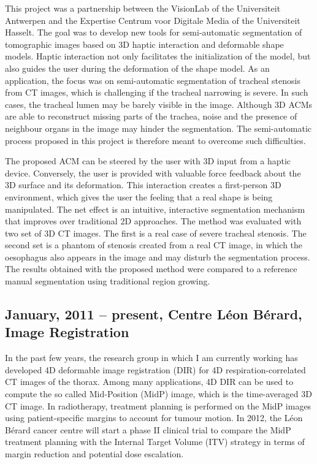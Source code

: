 \documentclass[a4paper]{article}
\begin{document}
This project was a partnership between the VisionLab of the Universiteit Antwerpen and the Expertise Centrum voor Digitale Media of the Universiteit Hasselt. The goal was to develop new tools for semi-automatic segmentation of tomographic images based on 3D haptic interaction and deformable shape models. Haptic interaction not only facilitates the initialization of the model, but also guides the user during the deformation of the shape model. As an application, the focus was on semi-automatic segmentation of tracheal stenosis from CT images, which is challenging if the tracheal narrowing is severe. In such cases, the tracheal lumen may be barely visible in the image. Although 3D ACMs are able to reconstruct missing parts of the trachea, noise and the presence of neighbour organs in the image may hinder the segmentation. The semi-automatic process proposed in this project is therefore meant to overcome such difficulties.

The proposed ACM can be steered by the user with 3D input from a haptic device. Conversely, the user is provided with valuable force feedback about the 3D surface and its deformation. This interaction creates a first-person 3D environment, which gives the user the feeling that a real shape is being manipulated. The net effect is an intuitive, interactive segmentation mechanism that improves over traditional 2D approaches. The method was evaluated with two set of 3D CT images. The first is a real case of severe tracheal stenosis. The second set is a phantom of stenosis created from a real CT image, in which the oesophagus also appears in the image and may disturb the segmentation process. The results obtained with the proposed method were compared to a reference manual segmentation using traditional region growing.

\renewcommand{\refname}{Related publications}
\begin{bibunit}[unsrt]
\nocite{Pinho:Trachea7}
\putbib[mybib]
\end{bibunit}


\subsection{January, 2011 -- present, Centre L\'eon B\'erard, Image Registration}

In the past few years, the research group in which I am currently working has developed 4D deformable image registration (DIR) for 4D respiration-correlated CT images of the thorax. Among many applications, 4D DIR can be used to compute the so called Mid-Position (MidP) image, which is the time-averaged 3D CT image. In radiotherapy, treatment planning is performed on the MidP images using patient-specific margins to account for tumour motion. In 2012, the L\'eon B\'erard cancer centre will start a phase II clinical trial to compare the MidP treatment planning with the Internal Target Volume (ITV) strategy in terms of margin reduction and potential dose escalation. 
\end{document}
